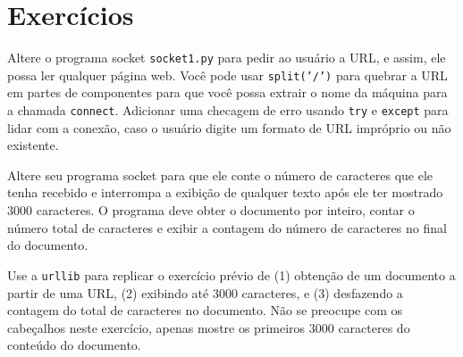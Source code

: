 
\section{Exercícios}

\begin{ex}
Altere o programa socket {\tt socket1.py} para pedir ao usuário a URL, e assim,
ele possa ler qualquer página web. Você pode usar {\tt split('/')} para quebrar
a URL em partes de componentes para que você possa extrair o nome da máquina
para a chamada {\tt connect}. Adicionar uma checagem de erro usando {\tt try}
e {\tt except} para lidar com a conexão, caso o usuário digite um formato de
URL impróprio ou não existente.  
\end{ex}

\begin{ex}
Altere seu programa socket para que ele conte o número de caracteres que ele
tenha recebido e interrompa a exibição de qualquer texto após ele ter mostrado
3000 caracteres.  O programa deve obter o documento por inteiro, contar o
número total de caracteres e exibir a contagem do número de caracteres no
final do documento.
\end{ex}

\begin{ex}
Use a {\tt urllib} para replicar o exercício prévio de (1) obtenção de um
documento a partir de uma URL, (2) exibindo até 3000 caracteres, e (3)
desfazendo a contagem do total de caracteres no documento.  Não se preocupe
com os cabeçalhos neste exercício, apenas mostre os primeiros 3000 caracteres
do conteúdo do documento.
\end{ex}

